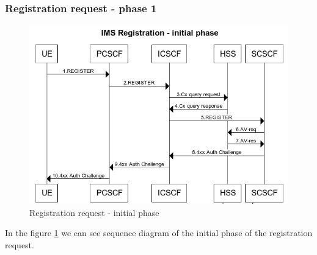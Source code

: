 \documentclass[hidelinks]{report}
\begin{document}
\subsubsection{Registration request - phase 1}
\begin{figure}[!htbp]
\begin{center}
\includegraphics[scale=0.5]{IMS_Registration_0.png} 
\caption{Registration request - initial phase }
\label{fig2}

\end{center}
\end{figure}
In the figure \ref{fig2} we can see sequence diagram of the initial phase of the registration request. 
\end{document}
